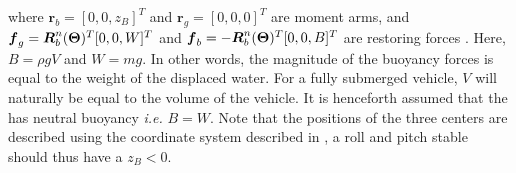 where $\boldsymbol{r}_b = [0, 0, z_B]^T$ and $\boldsymbol{r}_g = [0, 0, 0]^T$ are moment arms, and $\boldsymbol{f}_g = \boldsymbol{R}^n_b(\boldsymbol{\Theta})^T [0, 0, W]^T$ and $\boldsymbol{f}_b = -\boldsymbol{R}^n_b(\boldsymbol{\Theta})^T [0, 0, B]^T$ are restoring forces \citep[p. 60]{fossen2011}.
Here, $B = \rho g V$ and $W = m g$. In other words, the magnitude of the buoyancy forces is equal to the weight of the displaced water. For a fully submerged vehicle, $V$ will naturally be equal to the volume of the vehicle. It is henceforth assumed that the \abbrROV has neutral buoyancy \emph{i.e.} $B = W$. Note that the positions of the three centers are described using the coordinate system described in , a roll and pitch stable \abbrROV should thus have a $z_B < 0$.

